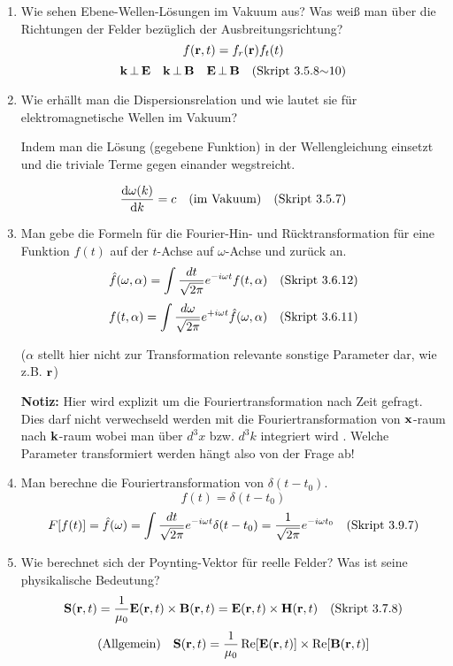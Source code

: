 \begin{enumerate}
  \item Wie sehen Ebene-Wellen-Lösungen im Vakuum aus? Was weiß man
        über die Richtungen der Felder bezüglich der 
        Ausbreitungsrichtung?
        $$f(\vb r , t)=f_r(\vb r)f_t(t)$$
        $$\vb k \,\bot\, \vb E \quad \vb k\,\bot\,\vb B \quad
        \vb E\,\bot\, \vb B\quad\text{(Skript 3.5.8$\sim$10)}$$

  \item Wie erhällt man die Dispersionsrelation und wie lautet sie für
        elektromagnetische Wellen im Vakuum?
        \begin{center}
          Indem man die Lösung (gegebene Funktion) in 
          der Wellengleichung einsetzt und die
          triviale Terme gegen einander wegstreicht.
        \end{center}
        $$\dv{\omega(k)}{k}=c \quad\text{(im Vakuum)}\quad\text{(Skript 3.5.7)}$$

  \item Man gebe die Formeln für die Fourier-Hin- und Rücktransformation
        für eine Funktion $f(t)$ auf der $t$-Achse auf $\omega$-Achse und
        zurück an.
        $$\hat f(\omega, \alpha)=\int \frac{dt}{\sqrt{2\pi}}
              e^{-i\omega t}f(t, \alpha)\quad\text{(Skript 3.6.12)}$$
        $$f(t, \alpha)=\int \frac{d\omega}{\sqrt{2\pi}}
                         e^{+i\omega t}\hat f(\omega, \alpha)
                        \quad\text{(Skript 3.6.11)}$$
        \begin{center}
          ($\alpha$ stellt hier nicht zur Transformation relevante 
          sonstige Parameter dar, wie z.B. $\vb r$)
        \end{center}
        \textbf{Notiz:} Hier wird explizit um die Fouriertransformation 
        nach Zeit gefragt. Dies darf nicht verwechseld werden mit die 
        Fouriertransformation von $\vb x$-raum nach $\vb k$-raum 
        wobei man über
        $d^3x$ bzw. $d^3k$ integriert wird .
        Welche Parameter transformiert werden hängt also von der Frage 
        ab!

  \item Man berechne die Fouriertransformation von $\delta(t-t_0)$.
        $$f(t)=\delta (t-t_0)$$ 
        $$F[f(t)]=\hat f(\omega)
        =\int\frac{dt}{\sqrt{2\pi}}e^{-i\omega t}\delta(t-t_0)
        =\frac{1}{\sqrt{2\pi}}e^{-i\omega t_0}
        \quad\text{(Skript 3.9.7)}$$ 

  \item Wie berechnet sich der Poynting-Vektor für reelle Felder? Was
        ist seine physikalische Bedeutung?
        $$\vb S(\vb r,t)=\frac{1}{\mu_0}\vb E(\vb r,t)\times\vb B(\vb r,t)
        =\vb E(\vb r,t)\times \vb H(\vb r,t)
        \quad\text{(Skript 3.7.8)}$$
        $$\text{(Allgemein)}\quad\vb S(\vb r,t)=
        \frac{1}{\mu_0}\Re[\vb E(\vb r,t)]\times \Re[\vb B(\vb r,t)]$$
        

\end{enumerate}

